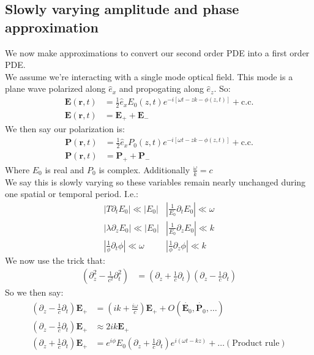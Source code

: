 \subsection{Slowly varying amplitude and phase approximation}
We now make approximations to convert our second order PDE into a first order PDE.\\
We assume we're interacting with a single mode optical field. This mode is a plane wave polarized along $\hat{e}_x$ and propogating along $\hat{e}_z$. So:
\begin{align*}
	\bm{E}(\bm{r},t) &= \frac{1}{2}\hat{e}_xE_0(z,t)e^{-i[\omega t-zk-\phi(z,t)]} + \text{c.c.} \\
	\bm{E}(\bm{r},t) &= \bm{E}_+ + \bm{E}_-
\end{align*}
We then say our polarization is:
\begin{align*}
	\bm{P}(\bm{r},t) &= \frac{1}{2}\hat{e}_xP_0(z,t)e^{-i[\omega t-zk-\phi(z,t)]} + \text{c.c.} \\
	\bm{P}(\bm{r},t) &= \bm{P}_+ + \bm{P}_-
\end{align*}
Where $E_0$ is real and $P_0$ is complex. Additionally $\frac{\omega}{k} = c$ \\
We say this is slowly varying so these variables remain nearly unchanged during one spatial or temporal period. I.e.:
\begin{align*}
	|T\partial_t E_0 | \ll |E_0| &
	|\frac{1}{E_0}\partial_t E_0 | \ll \omega  \\
	|\lambda \partial_z E_0| \ll |E_0| &
	|\frac{1}{E_0} \partial_z E_0| \ll k \\
	|\frac{1}{\phi}\partial_t\phi | \ll \omega &
	|\frac{1}{\phi}\partial_z\phi | \ll k
\end{align*}
We now use the trick that:
\begin{align*}
	\left(\partial_z^2 - \frac{1}{c^2}\partial_t^2\right) &= \left(\partial_z + \frac{1}{c}\partial_t\right)\left(\partial_z - \frac{1}{c}\partial_t\right)
\end{align*}
So we then say:
\begin{align*}
	\left(\partial_z - \frac{1}{c}\partial_t\right)\bm{E}_+ &= \left(ik + \frac{i\omega}{c}\right)\bm{E}_+ + O(\dot{\bm{E}_0}, \dot{\bm{P}_0},\ldots) \\
	\left(\partial_z - \frac{1}{c}\partial_t\right)\bm{E}_+ &\approx 2ik\bm{E}_+ \\
	\left(\partial_z + \frac{1}{c}\partial_t\right)\bm{E}_+ &= e^{i\phi}E_0 \left(\partial_z + \frac{1}{c}\partial_t\right)e^{i(\omega t - kz)} + \ldots (\text{Product rule})
\end{align*}
